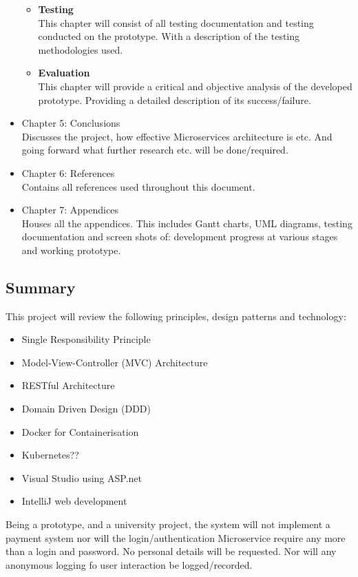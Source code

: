 \begin{itemize}
\begin{itemize}
					\item \textbf{Testing}
					\\This chapter will consist of all testing documentation and testing conducted on the prototype. With a description of the testing methodologies used.
					\item \textbf{Evaluation}
					\\This chapter will provide a critical and objective analysis of the developed prototype. Providing a detailed description of its success/failure.
				\end{itemize}
			\item Chapter 5: Conclusions
			\\Discusses the project, how effective Microservices architecture is etc. And going forward what further research etc. will be done/required.
			\item Chapter 6: References
			\\Contains all references used throughout this document.
			\item Chapter 7: Appendices
			\\Houses all the appendices. This includes Gantt charts, UML diagrams, testing documentation and screen shots of: development progress at various stages and working prototype.
		\end{itemize}
	\subsection{Summary}
	This project will review the following principles, design patterns and technology:
	\begin{itemize}
		\item Single Responsibility Principle
		\item Model-View-Controller (MVC) Architecture
		\item RESTful Architecture
		\item Domain Driven Design (DDD)
		\item Docker for Containerisation
		\item Kubernetes??
		\item Visual Studio using ASP.net
		\item IntelliJ web development
	\end{itemize}
	Being a prototype, and a university project, the system will not implement a payment system nor will the login/authentication Microservice require any more than a login and password. No personal details will be requested. Nor will any anonymous logging fo user interaction be logged/recorded.
